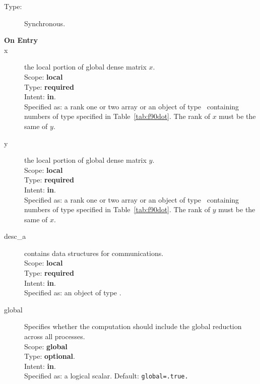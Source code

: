 \begin{description}
\item[Type:] Synchronous.
\item[\bf On Entry]
\item[x] the local portion of global dense matrix
$x$.\\
Scope: {\bf local} \\
Type: {\bf required} \\
Intent: {\bf in}.\\
Specified as:  a rank one or two array or an object of type \vdata\ 
containing numbers of type specified in
Table~\ref{tab:f90dot}. The rank of $x$ must be the same of $y$. 
\item[y] the local portion of global dense matrix
$y$. \\
Scope: {\bf local} \\
Type: {\bf required} \\
Intent: {\bf in}.\\
Specified as:  a rank one or two array or an object of type \vdata\ 
containing numbers of type specified in
Table~\ref{tab:f90dot}. The rank of $y$ must be the same of $x$. 
\item[desc\_a] contains data structures for communications.\\
Scope: {\bf local} \\
Type: {\bf required}\\
Intent: {\bf in}.\\
Specified as: an object of type \descdata.
\item[global]  Specifies whether the computation should include the
  global reduction across all processes.\\
Scope: {\bf global} \\
Type: {\bf optional}.\\
Intent: {\bf in}.\\
Specified as: a logical scalar.
Default: \verb|global=.true.|\\


\end{description}
